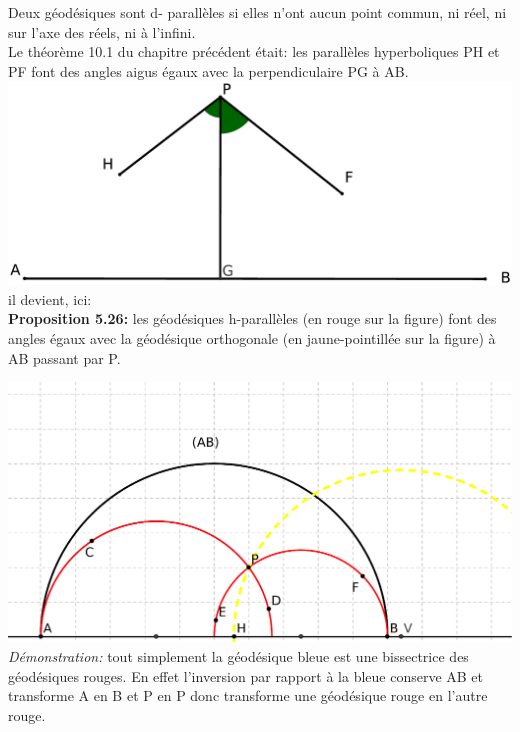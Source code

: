 \documentclass[a4paper, 12pt, twoside]{book}
\begin{document}
   Deux géodésiques sont d- parallèles si elles n'ont aucun point commun, ni réel, ni sur l'axe des réels, ni à l'infini.\\


 Le théorème 10.1 du chapitre précédent était:  les parallèles hyperboliques PH et PF font des angles aigus égaux avec la perpendiculaire PG à AB.\\
 
 
    \includegraphics[scale=0.2]{figures/Lobat3bis.eps}\\
  
 
 il devient, ici:\\
 
 \textbf{Proposition 5.26:} les géodésiques h-parallèles (en rouge sur la figure) font des angles égaux avec la géodésique orthogonale (en jaune-pointillée sur la figure) à AB passant par P.
 
  
    \includegraphics[scale=0.4]{figures/lob4.eps}\\
 
  
  
  
   \textit{Démonstration:} tout simplement la géodésique bleue est une bissectrice des géodésiques rouges. En effet l'inversion par rapport à la bleue conserve AB et transforme A en B et P en P donc transforme une géodésique rouge en l'autre rouge.\\
   
\end{document}
